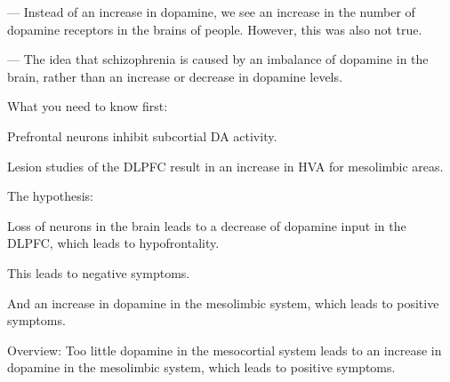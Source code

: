 \begin{coloredlist}
\begin{coloredlist}
\begin{coloredlist}
\begin{coloredlist}
                \begin{coloredlist}
                    \item {} — Instead of an increase in dopamine, we see an increase in the number of dopamine receptors in the brains of people. However, this was also not true.
                \end{coloredlist}
                \item {} — The idea that schizophrenia is caused by an imbalance of dopamine in the brain, rather than an increase or decrease in dopamine levels.
                \begin{coloredlist}
                    \item What you need to know first:
                    \begin{coloredlist}
                        \item Prefrontal neurons inhibit subcortial DA activity.
                        \begin{coloredlist}
                            \item Lesion studies of the DLPFC result in an increase in HVA for mesolimbic areas.
                        \end{coloredlist}
                    \end{coloredlist}
                    \item The hypothesis:
                    \begin{coloredlist}
                        \item Loss of neurons in the brain leads to a decrease of dopamine input in the DLPFC, which leads to hypofrontality.
                        \begin{coloredlist}
                            \item This leads to negative symptoms.
                            \item And an increase in dopamine in the mesolimbic system, which leads to positive symptoms.
                        \end{coloredlist}
                        \item Overview: Too little dopamine in the mesocortial system leads to an increase in dopamine in the mesolimbic system, which leads to positive symptoms.
                    \end{coloredlist}
                \end{coloredlist}
            \end{coloredlist}
        \end{coloredlist}
    \end{coloredlist}
\end{coloredlist}

